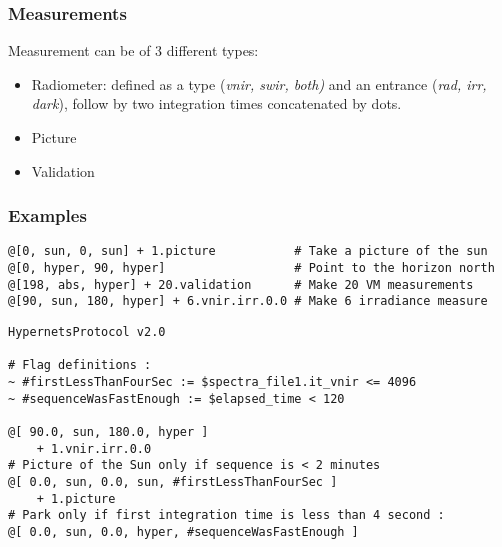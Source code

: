 \subsubsection{Measurements}
Measurement can be of 3 different types:
\begin{itemize}
	\item Radiometer: defined as a type (\textit{vnir, swir, both)} and 
		an entrance (\textit{rad, irr, dark}), follow by two integration times
		concatenated by dots.
	\item Picture
	\item Validation
\end{itemize}

\subsubsection{Examples}
\vspace{-10pt}
\begin{lstlisting}
@[0, sun, 0, sun] + 1.picture           # Take a picture of the sun
@[0, hyper, 90, hyper]                  # Point to the horizon north
@[198, abs, hyper] + 20.validation      # Make 20 VM measurements
@[90, sun, 180, hyper] + 6.vnir.irr.0.0 # Make 6 irradiance measure
\end{lstlisting}

\begin{lstlisting}
HypernetsProtocol v2.0

# Flag definitions :
~ #firstLessThanFourSec := $spectra_file1.it_vnir <= 4096
~ #sequenceWasFastEnough := $elapsed_time < 120

@[ 90.0, sun, 180.0, hyper ]
	+ 1.vnir.irr.0.0
# Picture of the Sun only if sequence is < 2 minutes
@[ 0.0, sun, 0.0, sun, #firstLessThanFourSec ]
	+ 1.picture
# Park only if first integration time is less than 4 second :
@[ 0.0, sun, 0.0, hyper, #sequenceWasFastEnough ]
\end{lstlisting}


